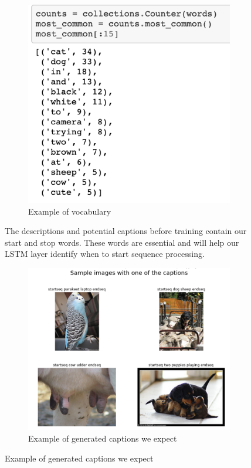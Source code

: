 \documentclass[conference]{IEEEtran}
\begin{document}
\begin{figure}[htbp]
\begin{figure}[htbp]
\centerline{\includegraphics[width=\linewidth]{samplevocab.png}}
\caption{Example of vocabulary}
\label{fig5}
\end{figure}

The descriptions and potential captions before training contain our start and stop words. These words are essential and will help our LSTM layer identify when to start sequence processing. 

\begin{figure}[htbp]
\centerline{\includegraphics[width=\linewidth]{samplecaptions.png}}
\caption{Example of generated captions we expect}
\label{fig6}
\end{figure}


\end{figure}
\end{document}

